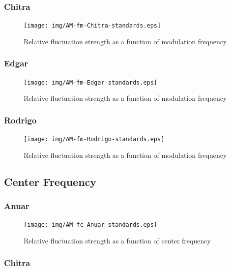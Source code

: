\documentclass[a4paper]{article}
\begin{document}
\subsubsection{Chitra}

\begin{figure}[H]
  \centering
  \texttt{[image: img/AM-fm-Chitra-standards.eps]}
  \caption{Relative fluctuation strength as a function of modulation frequency}
\label{fig:fm-chitra}
\end{figure}

\subsubsection{Edgar}

\begin{figure}[H]
  \centering
  \texttt{[image: img/AM-fm-Edgar-standards.eps]}
  \caption{Relative fluctuation strength as a function of modulation frequency}
\label{fig:fm-edgar}
\end{figure}

\subsubsection{Rodrigo}

\begin{figure}[H]
  \centering
  \texttt{[image: img/AM-fm-Rodrigo-standards.eps]}
  \caption{Relative fluctuation strength as a function of modulation frequency}
\label{fig:fm-rodrigo}
\end{figure}

\subsection{Center Frequency}

\subsubsection{Anuar}

\begin{figure}[H]
  \centering
  \texttt{[image: img/AM-fc-Anuar-standards.eps]}
  \caption{Relative fluctuation strength as a function of center frequency}
\label{fig:fc-anuar}
\end{figure}

\subsubsection{Chitra}
\end{document}
